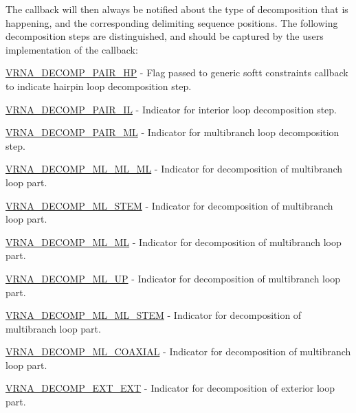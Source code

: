 The callback will then always be notified about the type of decomposition that is happening, and the corresponding delimiting sequence positions. The following decomposition steps are distinguished, and should be captured by the user\textquotesingle{}s implementation of the callback\+:


\begin{DoxyItemize}
\item \hyperlink{group__constraints_ga8bd41ebc8039378d242e4e8c273716a5}{V\+R\+N\+A\+\_\+\+D\+E\+C\+O\+M\+P\+\_\+\+P\+A\+I\+R\+\_\+\+H\+P} -\/ Flag passed to generic softt constraints callback to indicate hairpin loop decomposition step.
\item \hyperlink{group__constraints_gaeab04f34d7730cff2d651d782f95d857}{V\+R\+N\+A\+\_\+\+D\+E\+C\+O\+M\+P\+\_\+\+P\+A\+I\+R\+\_\+\+I\+L} -\/ Indicator for interior loop decomposition step.
\item \hyperlink{group__constraints_gaa15b1185673f0b9e900c4748d45f388f}{V\+R\+N\+A\+\_\+\+D\+E\+C\+O\+M\+P\+\_\+\+P\+A\+I\+R\+\_\+\+M\+L} -\/ Indicator for multibranch loop decomposition step.
\item \hyperlink{group__constraints_ga735517266f2e35e1374b8f1ea77ef23e}{V\+R\+N\+A\+\_\+\+D\+E\+C\+O\+M\+P\+\_\+\+M\+L\+\_\+\+M\+L\+\_\+\+M\+L} -\/ Indicator for decomposition of multibranch loop part.
\item \hyperlink{group__constraints_ga4a23054c75d8efc785de50e3ea87602f}{V\+R\+N\+A\+\_\+\+D\+E\+C\+O\+M\+P\+\_\+\+M\+L\+\_\+\+S\+T\+E\+M} -\/ Indicator for decomposition of multibranch loop part.
\item \hyperlink{group__constraints_ga7f4cb9ff7a33e67f0539bd39e7b19a78}{V\+R\+N\+A\+\_\+\+D\+E\+C\+O\+M\+P\+\_\+\+M\+L\+\_\+\+M\+L} -\/ Indicator for decomposition of multibranch loop part.
\item \hyperlink{group__constraints_gae6478dda14e50e2f2cb9ef333a29256e}{V\+R\+N\+A\+\_\+\+D\+E\+C\+O\+M\+P\+\_\+\+M\+L\+\_\+\+U\+P} -\/ Indicator for decomposition of multibranch loop part.
\item \hyperlink{group__constraints_ga63d8ceb8c96ae3b463e529e28cc0fe98}{V\+R\+N\+A\+\_\+\+D\+E\+C\+O\+M\+P\+\_\+\+M\+L\+\_\+\+M\+L\+\_\+\+S\+T\+E\+M} -\/ Indicator for decomposition of multibranch loop part.
\item \hyperlink{group__constraints_ga4fe48d575830b16c208e280e01ab1497}{V\+R\+N\+A\+\_\+\+D\+E\+C\+O\+M\+P\+\_\+\+M\+L\+\_\+\+C\+O\+A\+X\+I\+A\+L} -\/ Indicator for decomposition of multibranch loop part.
\item \hyperlink{group__constraints_ga437adf5115c1999304eff26b41e4c9b6}{V\+R\+N\+A\+\_\+\+D\+E\+C\+O\+M\+P\+\_\+\+E\+X\+T\+\_\+\+E\+X\+T} -\/ Indicator for decomposition of exterior loop part.

\end{DoxyItemize}
